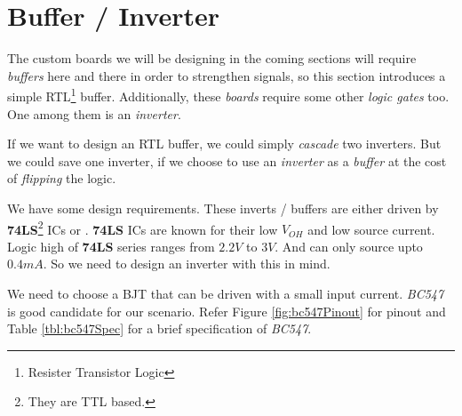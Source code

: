 \documentclass[../../main]{subfiles}
\begin{document}
\section{Buffer / Inverter} \label{sec:bufferOrInverter}

The custom boards we will be designing in the coming sections will require \emph{buffers}
here and there in order to strengthen signals, so this section introduces a simple
RTL\footnote{Resister Transistor Logic} buffer. Additionally, these \emph{boards} require
some other \emph{logic gates} too. One among them is an \emph{inverter}.

If we want to design an RTL buffer, we could simply \emph{cascade} two inverters. But we
could save one inverter, if we choose to use an \emph{inverter} as a \emph{buffer} at
the cost of \emph{flipping} the logic.


We have some design requirements. These inverts / buffers are either driven by
\textbf{74LS}\footnote{They are TTL based.} ICs or \esp. \textbf{74LS} ICs are known
for their low $\si{V}_{OH}$ and low source current. Logic high of \textbf{74LS} series ranges
from $2.2\si{V}$ to $3\si{V}$. And can only source upto $0.4\si{mA}$. So we need to
design an inverter with this in mind.

We need to choose a BJT that can be driven with a small input current. \emph{BC547} is
good candidate for our scenario. Refer Figure \ref{fig:bc547Pinout} for pinout and Table
\ref{tbl:bc547Spec} for a brief specification of \emph{BC547}.
\end{document}
